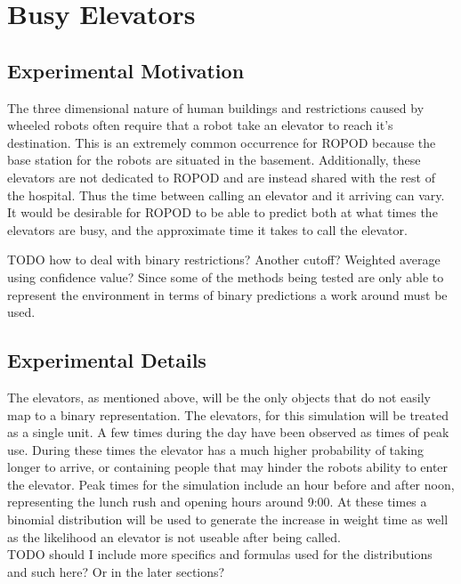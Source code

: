 \section{ Busy Elevators }

\subsection{ Experimental Motivation }

The three dimensional nature of human buildings and restrictions caused by
wheeled robots often require that a robot take an elevator to reach it's
destination. This is an extremely common occurrence for ROPOD because the
base station for the robots are situated in the basement. Additionally, these
elevators are not dedicated to ROPOD and are instead shared with the rest of the hospital.
Thus the time between calling an elevator and it arriving can vary. It would
be desirable for ROPOD to be able to predict both at what times the elevators
are busy, and the approximate time it takes to call the elevator.


TODO how to deal with binary restrictions? Another cutoff? Weighted average using confidence value?
Since some of the methods being tested are only able to represent the environment
in terms of binary predictions a work around must be used.

\subsection{ Experimental Details }

The elevators, as mentioned above, will be the only objects that do not easily
map to a binary representation. The elevators, for this simulation will be treated
as a single unit. A few times during the day have been observed as times of peak
use. During these times the elevator has a much higher probability of taking
longer to arrive, or containing people that may hinder the robots ability to enter
the elevator. Peak times for the simulation include an hour before and after
noon, representing the lunch rush and opening hours around 9:00. At these times
a binomial distribution will be used to generate the increase in weight time as
well as the likelihood an elevator is not useable after being called.\\

TODO should I include more specifics and formulas used for the distributions
and such here? Or in the later sections?



